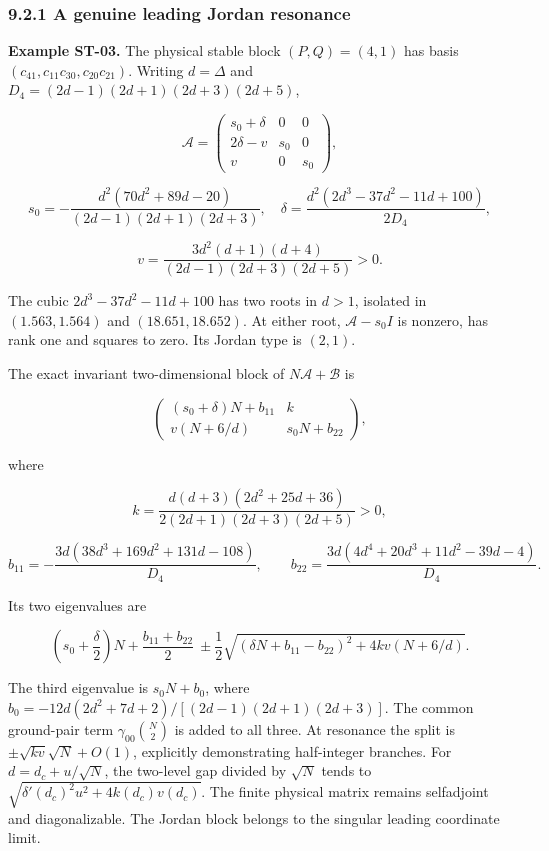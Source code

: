 \hypertarget{a-genuine-leading-jordan-resonance}{%
\subsubsection{9.2.1 A genuine leading Jordan resonance}\label{a-genuine-leading-jordan-resonance}}

\textbf{Example ST-03.} The physical stable block \((P,Q)=(4,1)\) has basis \((c_{41},c_{11}c_{30},c_{20}c_{21})\). Writing \(d=\Delta\) and \(D_4=(2d-1)(2d+1)(2d+3)(2d+5)\),

\[
\mathscr A=
\begin{pmatrix}
s_0+\delta&0&0\\
2\delta-v&s_0&0\\
v&0&s_0
\end{pmatrix},
\]

\[
s_0=-\frac{d^2(70d^2+89d-20)}{(2d-1)(2d+1)(2d+3)},\quad
\delta=\frac{d^2(2d^3-37d^2-11d+100)}{2D_4},
\]

\[
v=\frac{3d^2(d+1)(d+4)}{(2d-1)(2d+3)(2d+5)}>0.
\]

The cubic \(2d^3-37d^2-11d+100\) has two roots in \(d>1\), isolated in \((1.563,1.564)\) and \((18.651,18.652)\). At either root, \(\mathscr A-s_0I\) is nonzero, has rank one and squares to zero. Its Jordan type is \((2,1)\).

The exact invariant two-dimensional block of \(N\mathscr A+\mathscr B\) is

\[
\begin{pmatrix}
(s_0+\delta)N+b_{11}&k\\
v(N+6/d)&s_0N+b_{22}
\end{pmatrix},
\]

where

\[
k=\frac{d(d+3)(2d^2+25d+36)}{2(2d+1)(2d+3)(2d+5)}>0,
\]

\[
b_{11}=-\frac{3d(38d^3+169d^2+131d-108)}{D_4},\qquad
b_{22}=\frac{3d(4d^4+20d^3+11d^2-39d-4)}{D_4}.
\]

Its two eigenvalues are

\[
\left(s_0+\frac\delta2\right)N+\frac{b_{11}+b_{22}}2
\ \pm\frac12\sqrt{(\delta N+b_{11}-b_{22})^2+4kv(N+6/d)}.
\]

The third eigenvalue is \(s_0N+b_0\), where \(b_0=-12d(2d^2+7d+2)/[(2d-1)(2d+1)(2d+3)]\). The common ground-pair term \(\gamma_{00}\binom N2\) is added to all three. At resonance the split is \(\pm\sqrt{kv}\sqrt N+O(1)\), explicitly demonstrating half-integer branches. For \(d=d_c+u/\sqrt N\), the two-level gap divided by \(\sqrt N\) tends to \(\sqrt{\delta'(d_c)^2u^2+4k(d_c)v(d_c)}\). The finite physical matrix remains selfadjoint and diagonalizable. The Jordan block belongs to the singular leading coordinate limit.

